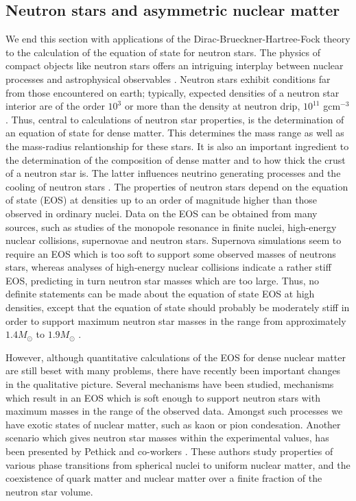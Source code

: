 \subsection{Neutron stars and asymmetric nuclear matter}

We end this section with applications of the Dirac-Brueckner-Hartree-Fock
theory to the calculation of the equation of state for neutron
stars.
The physics of compact objects like neutron stars
offers
an intriguing interplay between nuclear processes  and
astrophysical observables \cite{chris92a,wg91}.
Neutron stars exhibit conditions far from those encountered on earth;
typically, expected densities of a neutron star interior are of the
order $10^3$ or more than the density at neutron drip, $10^{11}$ gcm$^{-3}$.
Thus, central to calculations of neutron star properties, is the
determination of an equation of state for dense matter. This determines
the mass range as well as the mass-radius relantionship for these stars.
It is also an important ingredient to the determination of the
composition of dense matter and to how
thick the crust of a neutron star is.
The latter influences neutrino generating processes and the cooling
of neutron stars \cite{chris92b}.
The properties of neutron stars depend on the equation of state (EOS)
at densities up to an order of magnitude higher than those observed
in ordinary nuclei.
Data on the EOS can be obtained from many sources, such as studies of
the monopole resonance in finite nuclei, high-energy
nuclear collisions, supernovae and neutron  stars.
Supernova simulations seem to require  an EOS which is too soft to
support some observed masses of neutrons stars, whereas analyses of
high-energy nuclear collisions indicate a rather stiff EOS, predicting
in turn neutron star masses which are too large.
Thus, no definite statements can be made
about the equation of state EOS at high densities, except that the
equation of state should probably be moderately stiff in order to
support maximum neutron star masses in the range
from approximately $1.4 M_{\odot}$ to $1.9 M_{\odot}$ \cite{thorsett93}.

However, although quantitative calculations of the EOS for dense
nuclear matter are still beset with many problems, there have recently
been important changes in the qualitative picture. Several mechanisms
have been studied, mechanisms which
result in an EOS which is soft enough to support
neutron stars with maximum masses in the range of the observed data.
Amongst such processes
we have exotic states of nuclear matter, such as
kaon 
\cite{kn87,brown93} or pion condesation.
Another scenario which gives neutron star masses 
within the experimental 
values, has been presented by Pethick and co-workers
\cite{lrp93,hps93}. These authors study
properties of various phase transitions
from spherical nuclei to uniform nuclear matter, and the coexistence
of quark matter and nuclear matter over a finite fraction of the
neutron star volume. 



